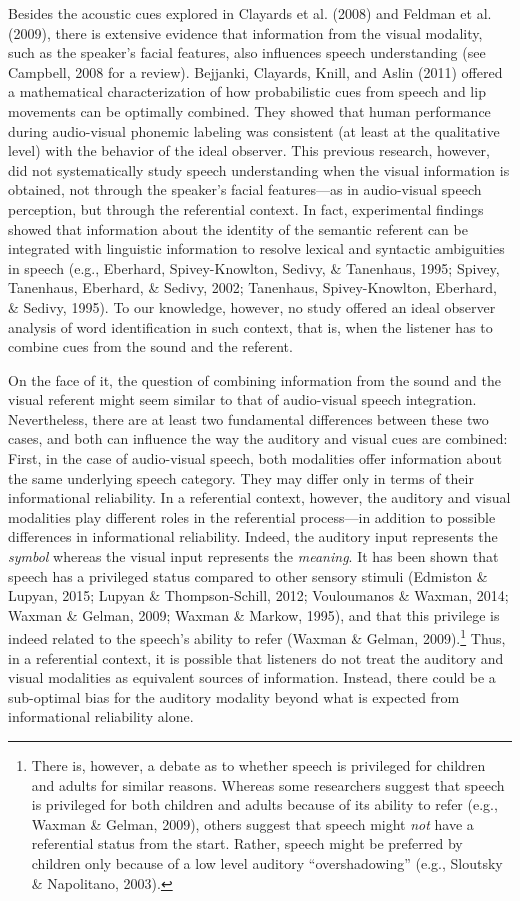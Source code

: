 \documentclass[english,floatsintext,man]{apa6}
\theoremstyle{definition}
\theoremstyle{definition}
\theoremstyle{definition}
\theoremstyle{remark}
\begin{document}
Besides the acoustic cues explored in Clayards et al. (2008) and Feldman
et al. (2009), there is extensive evidence that information from the
visual modality, such as the speaker's facial features, also influences
speech understanding (see Campbell, 2008 for a review). Bejjanki,
Clayards, Knill, and Aslin (2011) offered a mathematical
characterization of how probabilistic cues from speech and lip movements
can be optimally combined. They showed that human performance during
audio-visual phonemic labeling was consistent (at least at the
qualitative level) with the behavior of the ideal observer. This
previous research, however, did not systematically study speech
understanding when the visual information is obtained, not through the
speaker's facial features---as in audio-visual speech perception, but
through the referential context. In fact, experimental findings showed
that information about the identity of the semantic referent can be
integrated with linguistic information to resolve lexical and syntactic
ambiguities in speech (e.g., Eberhard, Spivey-Knowlton, Sedivy, \&
Tanenhaus, 1995; Spivey, Tanenhaus, Eberhard, \& Sedivy, 2002;
Tanenhaus, Spivey-Knowlton, Eberhard, \& Sedivy, 1995). To our
knowledge, however, no study offered an ideal observer analysis of word
identification in such context, that is, when the listener has to
combine cues from the sound and the referent.

On the face of it, the question of combining information from the sound
and the visual referent might seem similar to that of audio-visual
speech integration. Nevertheless, there are at least two fundamental
differences between these two cases, and both can influence the way the
auditory and visual cues are combined: First, in the case of
audio-visual speech, both modalities offer information about the same
underlying speech category. They may differ only in terms of their
informational reliability. In a referential context, however, the
auditory and visual modalities play different roles in the referential
process---in addition to possible differences in informational
reliability. Indeed, the auditory input represents the \emph{symbol}
whereas the visual input represents the \emph{meaning}. It has been
shown that speech has a privileged status compared to other sensory
stimuli (Edmiston \& Lupyan, 2015; Lupyan \& Thompson-Schill, 2012;
Vouloumanos \& Waxman, 2014; Waxman \& Gelman, 2009; Waxman \& Markow,
1995), and that this privilege is indeed related to the speech's ability
to refer (Waxman \& Gelman, 2009).\footnote{There is, however, a debate
  as to whether speech is privileged for children and adults for similar
  reasons. Whereas some researchers suggest that speech is privileged
  for both children and adults because of its ability to refer (e.g.,
  Waxman \& Gelman, 2009), others suggest that speech might \emph{not}
  have a referential status from the start. Rather, speech might be
  preferred by children only because of a low level auditory
  ``overshadowing'' (e.g., Sloutsky \& Napolitano, 2003).} Thus, in a
referential context, it is possible that listeners do not treat the
auditory and visual modalities as equivalent sources of information.
Instead, there could be a sub-optimal bias for the auditory modality
beyond what is expected from informational reliability alone.
\end{document}
